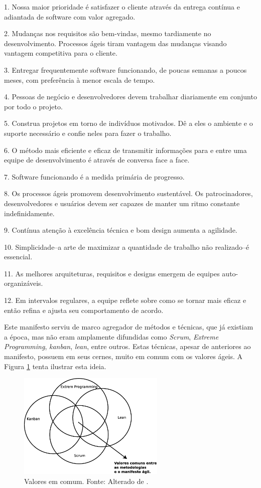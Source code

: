 \begin{citacao}
		1. Nossa maior prioridade é satisfazer o cliente
		através da entrega contínua e adiantada
		de software com valor agregado.

		2. Mudanças nos requisitos são bem-vindas,
		mesmo tardiamente no desenvolvimento.
		Processos ágeis tiram vantagem das
		mudanças visando vantagem competitiva para o cliente.

		3. Entregar frequentemente software funcionando,
		de poucas semanas a poucos meses,
		com preferência à menor escala de tempo.

		4. Pessoas de negócio e desenvolvedores devem trabalhar
		diariamente em conjunto por todo o projeto.

		5. Construa projetos em torno de indivíduos motivados.
		Dê a eles o ambiente e o suporte necessário
		e confie neles para fazer o trabalho.

		6. O método mais eficiente e eficaz de transmitir
		informações para e entre uma equipe de desenvolvimento
		é através de conversa face a face.

		7. Software funcionando é a medida primária de progresso.

		8. Os processos ágeis promovem desenvolvimento
		sustentável. Os patrocinadores, desenvolvedores e
		usuários devem ser capazes de manter um ritmo
		constante indefinidamente.

		9. Contínua atenção à excelência técnica e bom design
		aumenta a agilidade.

		10. Simplicidade--a arte de maximizar a quantidade de
		trabalho não realizado--é essencial.

		11. As melhores arquiteturas, requisitos e designs
		emergem de equipes auto-organizáveis.

		12. Em intervalos regulares, a equipe reflete sobre como
		se tornar mais eficaz e então refina e ajusta seu
		comportamento de acordo. 
\end{citacao}

Este manifesto serviu de marco agregador de métodos e técnicas, que já existiam a época, mas não eram amplamente difundidas como \emph{Scrum}, \emph{Extreme Programming}, \emph{kanban}, \emph{lean}, entre outros. 
Estas técnicas, apesar de anteriores ao manifesto, possuem em seus cernes, muito em comum com os valores ágeis.
A Figura \ref{cap2_valores} tenta ilustrar esta ideia.

\begin{figure}[H]
	\centering
	\includegraphics[width=7cm]{figuras/cap2_valores.eps}
	\caption{Valores em comum. Fonte: Alterado de .}
	\label{cap2_valores}
\end{figure}

